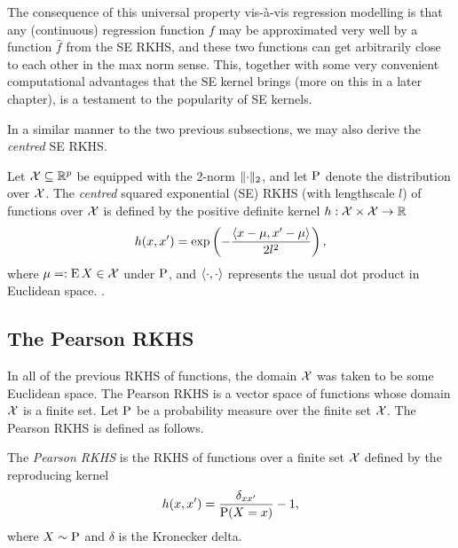 The consequence of this universal property vis-à-vis regression modelling is that any (continuous) regression function $f$ may be approximated very well by a function $\hat f$ from the SE RKHS, and these two functions can get arbitrarily close to each other in the max norm sense.
This, together with some very convenient computational advantages that the SE kernel brings (more on this in a later chapter), is a testament to the popularity of SE kernels.

In a similar manner to the two previous subsections, we may also derive the \emph{centred} SE RKHS. 

\begin{definition}
  Let ${\mathcal X} \subseteq \mathbb{R}^p$ be equipped with the 2-norm $\lVert\cdot\rVert_2$, and let $\operatorname{P}$ denote the distribution over ${\mathcal X}$.
  The \emph{centred} squared exponential (SE) RKHS (with lengthscale $l$) of functions over ${\mathcal X}$ is defined by the positive definite kernel $h:{\mathcal X}\times{\mathcal X}\to\mathbb{R}$ 
  \[
    h(x,x') = \exp\left(-\frac{\langle x-\mu,x'-\mu\rangle}{2l^2} \right),
  \]
  where $\mu =: \operatorname{E} X \in{\mathcal X} $ under $\operatorname{P}$, and $\langle\cdot,\cdot\rangle$ represents the usual dot product in Euclidean space.
  .
\end{definition}


\subsection{The Pearson RKHS}

In all of the previous RKHS of functions, the domain ${\mathcal X}$ was taken to be some Euclidean space. 
The Pearson RKHS is a vector space of functions whose domain ${\mathcal X}$ is a finite set.
Let $\operatorname{P}$ be a probability measure over the finite set ${\mathcal X}$. 
The Pearson RKHS is defined as follows.

\begin{definition}
  The \emph{Pearson RKHS} is the RKHS of functions over a finite set ${\mathcal X}$ defined by the reproducing kernel
  \[
    h(x,x') = \frac{\delta_{xx'}}{\operatorname{P}(X=x)} - 1,
  \]
  where $X \sim \operatorname{P}$ and $\delta$ is the Kronecker delta.
\end{definition}

